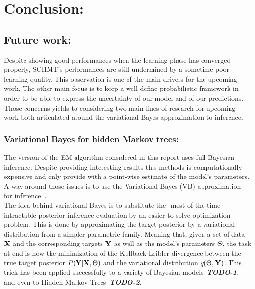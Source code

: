 \documentclass[a4paper,11pt]{report}
\begin{document}
\chapter{Conclusion:}
	\label{chap:ccl}

  \section{Future work:}
  
		Despite showing good performances when the learning phase has converged properly, SCHMT's performances are still undermined by a sometime poor learning quality. This observation is one of the main drivers for the upcoming work. The other main focus is to keep a well define probabilistic framework in order to be able to express the uncertainty of our model and of our predictions. Those concerns yields to considering two main lines of research for upcoming work both articulated around the variational Bayes approximation to inference.\\
		
		\subsection{Variational Bayes for hidden Markov trees:}
		
			The version of the EM algorithm considered in this report uses full Bayesian inference. Despite providing interesting results this methods is computationally expensive and only provide with a point-wise estimate of the model's parameters. A way around those issues is to use the Variational Bayes (VB) approximation for inference~\cite{wainwright2008graphical}.\\
			
			The idea behind variational Bayes is to substitute the -most of the time- intractable posterior inference evaluation by an easier to solve optimization problem. This is done by approximating the target posterior by a variational distribution from a simpler parametric family. Meaning that, given a set of data ${\bf X}$ and the corresponding targets ${\bf Y}$ as well as the model's parameters $\Theta$, the task at end is now the minimization of the Kullback-Leibler divergence between the true target posterior $P({\bf Y} | {\bf X}, \Theta)$ and the variational distribution $q(\Theta, {\bf Y})$. This trick has been applied successfully to a variety of Bayesian models~\textbf{\textit{TODO-1}}, and even to Hidden Markov Trees~\textbf{\textit{TODO-2}}.\\
			
\end{document}
